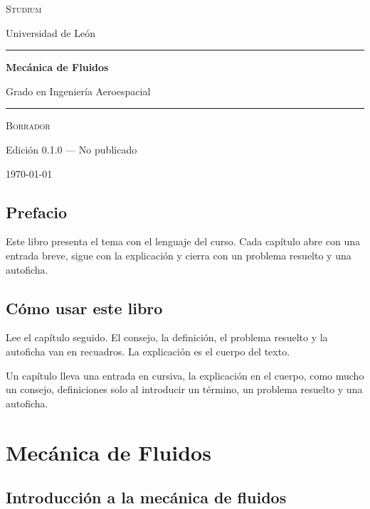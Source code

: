 \documentclass{book}
\begin{document}
\frontmatter
\thispagestyle{empty}
\setlength{\parindent}{0pt}
\vspace*{0.08\textheight}
{\normalsize\scshape\color{studiumInk} Studium\par}
{\small Universidad de León\par}
\vspace{0.55em}
{\color{studiumRule}\rule{\linewidth}{0.9pt}\par}
\vspace{0.16\textheight}
{\raggedright\Huge\bfseries Mecánica de Fluidos\par}
\vspace{0.9em}
{\raggedright\Large\color{studiumInk} Grado en Ingeniería Aeroespacial\par}
\vfill
{\color{studiumRule}\rule{0.36\linewidth}{0.45pt}\par}
\vspace{1.05em}
{\large\scshape Borrador\par}
\vspace{0.45em}
{\normalsize Edición 0.1.0 --- No publicado\par}
\vspace{0.4em}
{\normalsize\today\par}
\vspace*{0.08\textheight}
\clearpage
\chapter{Prefacio}
\noindent Este libro presenta el tema con el lenguaje del curso. Cada capítulo abre con una entrada breve, sigue con la explicación y cierra con un problema resuelto y una autoficha.
\chapter{Cómo usar este libro}
\noindent Lee el capítulo seguido. El consejo, la definición, el problema resuelto y la autoficha van en recuadros. La explicación es el cuerpo del texto.

\noindent Un capítulo lleva una entrada en cursiva, la explicación en el cuerpo, como mucho un consejo, definiciones solo al introducir un término, un problema resuelto y una autoficha.
\tableofcontents
\mainmatter
\part{Mecánica de Fluidos}

\chapter{Introducción a la mecánica de fluidos}
\end{document}
